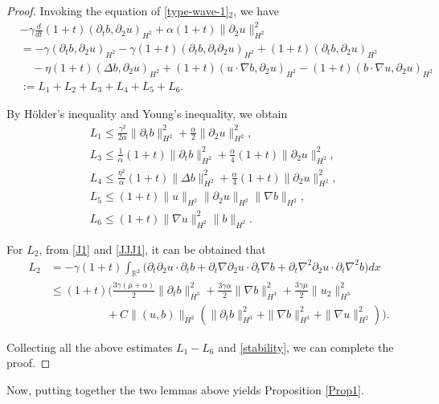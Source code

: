 \documentclass[reqno,11pt]{amsart}
\def\R{\mathbb R}
\numberwithin{Thm}{section}
\begin{document}
 \begin{proof}
 Invoking the equation of  \eqref{type-wave-1}$_2$, we have
 \begin{align*}
&-\gamma\frac{d}{dt}(1+t)(\partial_tb,\partial_2u)_{H^2}+\alpha(1+t)\|\partial_2u\|_{H^2}^2\nonumber\\
&=-\gamma(\partial_tb,\partial_2u)_{H^2}-\gamma(1+t)(\partial_tb,\partial_t\partial_2u)_{H^2}+(1+t)(\partial_tb,\partial_2u)_{H^2}\nonumber\\
&\quad-\eta(1+t)(\Delta b,\partial_2u)_{H^2}+(1+t)(u\cdot\nabla b,\partial_2u)_{H^2}-(1+t)(b\cdot\nabla u,\partial_2u)_{H^2}\nonumber\\
&:=L_{1}+L_2+L_3+L_4+L_5+L_6.
\end{align*}

By H\"{o}lder's inequality and Young's inequality, we obtain
 \begin{align*}
&L_1\leq \frac{\gamma^2}{2\alpha}\|\partial_t b\|_{H^2}^2+\frac{\alpha}{2}\|\partial_2u\|_{H^2}^2,\\
&L_3\leq \frac{1}{\alpha}(1+t)\|\partial_tb\|_{H^2}^2+\frac{\alpha}{4}(1+t)\|\partial_2u\|_{H^2}^2,\\
&L_4\leq \frac{\eta^2}{\alpha}(1+t)\|\Delta b\|_{H^2}^2+\frac{\alpha}{4}(1+t)\|\partial_2u\|_{H^2}^2,
\\&L_5\leq (1+t)\| u\|_{H^2}\| \partial_2u\|_{H^2}\|\nabla b\|_{H^2},
\\&L_6\leq(1+t)\| \nabla u\|_{H^2}^2\| b\|_{H^2}.
\end{align*}



For $L_2$, from \eqref{J1} and \eqref{JJJ1}, it can be obtained that
\begin{align*}
L_2&=-\gamma(1+t)\int_{\R^2}\big(\partial_t\partial_2 u\cdot \partial_tb+\partial_t \nabla\partial_2u\cdot \partial_t\nabla b+\partial_t\nabla^2\partial_2 u\cdot\partial_t \nabla^2b\big)dx\\
&\leq(1+t)\bigg(\frac{3\gamma(\mu+\alpha)}{2}\|\partial_t b\|_{H^3}^2+\frac{3\gamma\alpha}{2}\|\nabla b\|_{H^3}^2+\frac{3\gamma\mu}{2}\|u_2\|_{H^3}^2\\
&\qquad\qquad\quad+ C\| (u,b)\|_{H^{3}}\left(\|\partial_t b\|_{H^{3}}^2+\|\nabla b\|_{H^{3}}^2+\|\nabla u\|_{H^{2}}^2\right)\bigg).
\end{align*}

Collecting all the above estimates $L_1-L_6$ and \eqref{stability}, we can complete the proof.
 \end{proof}

  Now, putting together the two lemmas above yields Proposition \ref{Prop1}.
\end{document}

